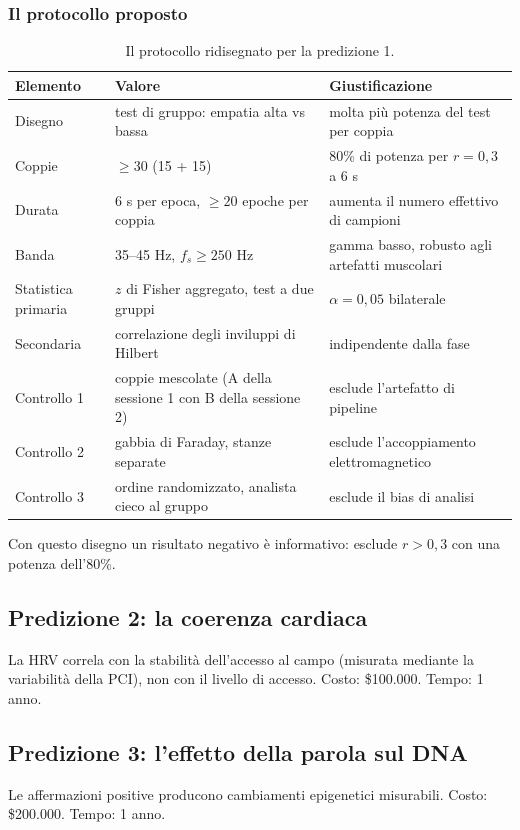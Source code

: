 \documentclass[11pt,a4paper]{article}
\begin{document}
\subsubsection*{Il protocollo proposto}
\begin{table}[H]
\centering
\small
\begin{tabular}{@{}p{3.2cm}p{4.6cm}p{6.2cm}@{}}
\toprule
\textbf{Elemento} & \textbf{Valore} & \textbf{Giustificazione} \\ \midrule
Disegno & test di gruppo: empatia alta vs bassa & molta più potenza del test per coppia \\
Coppie & $\geq 30$ (15 + 15) & 80\% di potenza per $r = 0,3$ a 6 s \\
Durata & 6 s per epoca, $\geq 20$ epoche per coppia & aumenta il numero effettivo di campioni \\
Banda & 35--45 Hz, $f_s \geq 250$ Hz & gamma basso, robusto agli artefatti muscolari \\
Statistica primaria & $z$ di Fisher aggregato, test a due gruppi & $\alpha = 0,05$ bilaterale \\
Secondaria & correlazione degli inviluppi di Hilbert & indipendente dalla fase \\
Controllo 1 & coppie mescolate (A della sessione 1 con B della sessione 2) & esclude l'artefatto di pipeline \\
Controllo 2 & gabbia di Faraday, stanze separate & esclude l'accoppiamento elettromagnetico \\
Controllo 3 & ordine randomizzato, analista cieco al gruppo & esclude il bias di analisi \\ \bottomrule
\end{tabular}
\caption{Il protocollo ridisegnato per la predizione 1.}
\label{tab:protocol}
\end{table}

Con questo disegno un risultato negativo è informativo: esclude $r > 0,3$ con una potenza dell'80\%.

\subsection{Predizione 2: la coerenza cardiaca}
La HRV correla con la stabilità dell'accesso al campo (misurata mediante la variabilità della PCI), non con il livello di accesso. Costo: \$100.000. Tempo: 1 anno.

\subsection{Predizione 3: l'effetto della parola sul DNA}
Le affermazioni positive producono cambiamenti epigenetici misurabili. Costo: \$200.000. Tempo: 1 anno.
\end{document}
